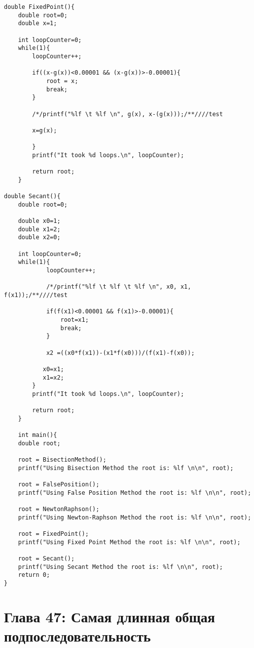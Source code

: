 \begin{tcolorbox}
\begin{verbatim}
double FixedPoint(){
    double root=0;
    double x=1;
    
    int loopCounter=0;
    while(1){
        loopCounter++;
        
        if((x-g(x))<0.00001 && (x-g(x))>-0.00001){
            root = x;
            break;
        }
        
        /*/printf("%lf \t %lf \n", g(x), x-(g(x)));/**////test
        
        x=g(x);
        
        }
        printf("It took %d loops.\n", loopCounter);
        
        return root;
    }

double Secant(){
    double root=0;
    
    double x0=1;
    double x1=2;
    double x2=0;
    
    int loopCounter=0;
    while(1){
            loopCounter++;
            
            /*/printf("%lf \t %lf \t %lf \n", x0, x1, f(x1));/**////test
            
            if(f(x1)<0.00001 && f(x1)>-0.00001){
                root=x1;
                break;
            }
            
            x2 =((x0*f(x1))-(x1*f(x0)))/(f(x1)-f(x0));
            
           x0=x1;
           x1=x2;
        }
        printf("It took %d loops.\n", loopCounter);
        
        return root;
    }
    
    int main(){
    double root;
    
    root = BisectionMethod();
    printf("Using Bisection Method the root is: %lf \n\n", root);
    
    root = FalsePosition();
    printf("Using False Position Method the root is: %lf \n\n", root);
    
    root = NewtonRaphson();
    printf("Using Newton-Raphson Method the root is: %lf \n\n", root);
    
    root = FixedPoint();
    printf("Using Fixed Point Method the root is: %lf \n\n", root);
    
    root = Secant();
    printf("Using Secant Method the root is: %lf \n\n", root);
    return 0;
}
\end{verbatim}
\end{tcolorbox}
\vspace{\baselineskip}

\newpage
\chapter*{Глава 47: Самая длинная общая подпоследовательность}
